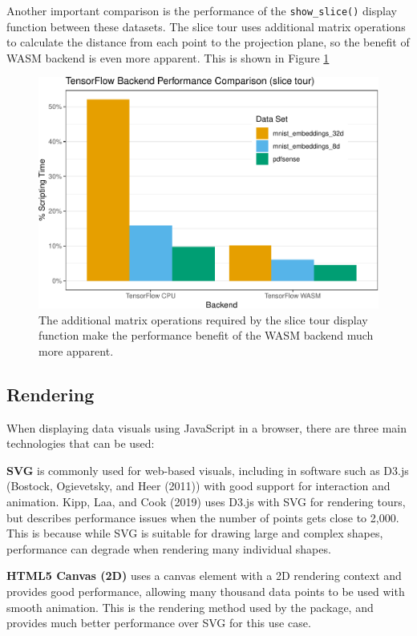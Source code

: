 Another important comparison is the performance of the \texttt{show\_slice()} display function between these datasets. The slice tour uses additional matrix operations to calculate the distance from each point to the projection plane, so the benefit of WASM backend is even more apparent. This is shown in Figure \ref{fig:backend-comparison-slice}

\begin{figure}

{\centering \includegraphics[width=0.75\linewidth]{detourr_files/figure-latex/backend-comparison-slice-1} 

}

\caption{The additional matrix operations required by the slice tour display function make the performance benefit of the WASM backend much more apparent.}\label{fig:backend-comparison-slice}
\end{figure}

\hypertarget{rendering}{%
\subsection{Rendering}\label{rendering}}

When displaying data visuals using JavaScript in a browser, there are three main technologies that can be used:

\textbf{SVG} is commonly used for web-based visuals, including in software such as D3.js (Bostock, Ogievetsky, and Heer (2011)) with good support for interaction and animation. Kipp, Laa, and Cook (2019) uses D3.js with SVG for rendering tours, but describes performance issues when the number of points gets close to 2,000. This is because while SVG is suitable for drawing large and complex shapes, performance can degrade when rendering many individual shapes.

\textbf{HTML5 Canvas (2D)} uses a canvas element with a 2D rendering context and provides good performance, allowing many thousand data points to be used with smooth animation. This is the rendering method used by the  package, and provides much better performance over SVG for this use case.

